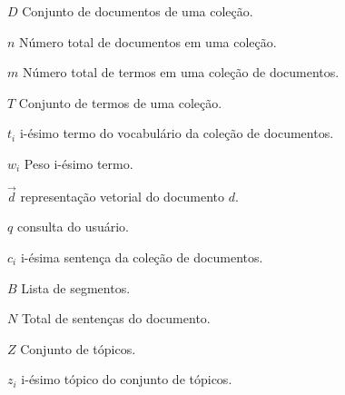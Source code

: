 


\begin{simbolos}

	\item[$D $]		Conjunto de documentos de uma coleção. 
	\item[$n $]		Número total de documentos em uma coleção.
	\item[$m $]		Número total de termos em uma coleção de documentos.
	\item[$T $]		Conjunto de termos de uma coleção. 
	\item[$t_i $]		i-ésimo termo do vocabulário da coleção de documentos. 
	\item[$w_i $]		Peso i-ésimo termo.
	\item[$ \vec{d} $]	representação vetorial do documento $d$.
	\item[$ q $]		consulta do usuário.
	\item[$ c_i $]		i-ésima sentença da coleção de documentos. 
	\item[$ B $]		Lista de segmentos. 
	\item[$ N $]		Total de sentenças do documento.
	\item[$ Z $]		Conjunto de tópicos. 
	\item[$ z_i $]		i-ésimo tópico do conjunto de tópicos. 

	 
	 
	 


 
 
 
 
 
 
 
 
 
 
 
 
 
 
 
 
 
 
 
 
  \end{simbolos}





